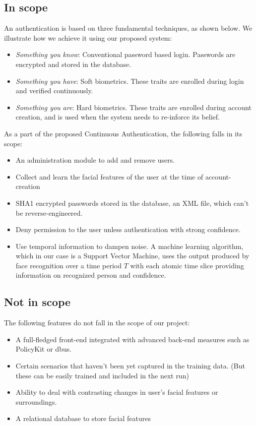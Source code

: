 \documentclass[12pt]{article}			%
\begin{document}
\subsection{In scope}
An authentication is based on three fundamental techniques, as shown below. We illustrate how we achieve it using our proposed system:
\begin{itemize}
	\item \emph{Something you know}: Conventional password based login. Passwords are encrypted and stored in the database.
	\item \emph{Something you have}: Soft biometrics. These traits are enrolled during login and verified continuously.
	\item \emph{Something you are}: Hard biometrics. These traits are enrolled during account creation, and is used when the system needs to re-inforce its belief.
\end{itemize}
As a part of the proposed Continuous Authentication, the following falls in its scope:
\begin{itemize}
	\item An administration module to add and remove users.
	\item Collect and learn the facial features of the user at the time of account-creation
	\item SHA1 encrypted passwords stored in the database, an XML file, which can't be reverse-engineered.
	\item Deny permission to the user unless authentication with strong confidence.
	\item Use temporal information to dampen noise. A machine learning algorithm, which in our case is a Support Vector Machine, uses the output produced by face recognition over a time period $T$ with each atomic time slice providing information on recognized person and confidence.
\end{itemize}

\subsection{Not in scope}
The following features do not fall in the scope of our project:
\begin{itemize}
	\item A full-fledged front-end integrated with advanced back-end measures such as PolicyKit or dbus. 
	\item Certain scenarios that haven't been yet captured in the training data. (But these can be easily trained and included in the next run)
	\item Ability to deal with contrasting changes in user's facial features or surroundings.
	\item A relational database to store facial features
\end{itemize}
\end{document}
